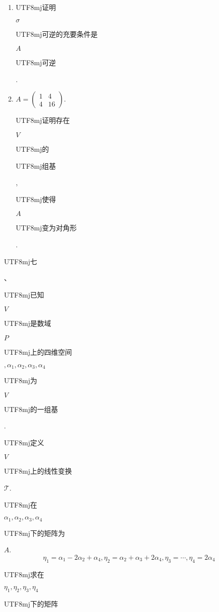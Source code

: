 \documentclass[10pt]{article}
\begin{document}
\begin{enumerate}
  \item \begin{CJK}{UTF8}{mj}证明\end{CJK} $\sigma$ \begin{CJK}{UTF8}{mj}可逆的充要条件是\end{CJK} $A$ \begin{CJK}{UTF8}{mj}可逆\end{CJK}.

  \item $A=\left(\begin{array}{cc}1 & 4 \\ 4 & 16\end{array}\right)$. \begin{CJK}{UTF8}{mj}证明存在\end{CJK} $V$ \begin{CJK}{UTF8}{mj}的\end{CJK} \begin{CJK}{UTF8}{mj}组基\end{CJK}, \begin{CJK}{UTF8}{mj}使得\end{CJK} $A$ \begin{CJK}{UTF8}{mj}变为对角形\end{CJK}.

\end{enumerate}
\begin{CJK}{UTF8}{mj}七\end{CJK}、\begin{CJK}{UTF8}{mj}已知\end{CJK} $V$ \begin{CJK}{UTF8}{mj}是数域\end{CJK} $P$ \begin{CJK}{UTF8}{mj}上的四维空间\end{CJK} $, \alpha_{1}, \alpha_{2}, \alpha_{3}, \alpha_{4}$ \begin{CJK}{UTF8}{mj}为\end{CJK} $V$ \begin{CJK}{UTF8}{mj}的一组基\end{CJK}. \begin{CJK}{UTF8}{mj}定义\end{CJK} $V$ \begin{CJK}{UTF8}{mj}上的线性变换\end{CJK} $\mathscr{T}$. \begin{CJK}{UTF8}{mj}在\end{CJK} $\alpha_{1}, \alpha_{2}, \alpha_{3}, \alpha_{4}$ \begin{CJK}{UTF8}{mj}下的矩阵为\end{CJK} $A$.
$$
\eta_{1}=\alpha_{1}-2 \alpha_{2}+\alpha_{4}, \eta_{2}=\alpha_{2}+\alpha_{3}+2 \alpha_{4}, \eta_{3}=\cdots, \eta_{4}=2 \alpha_{4}
$$
\begin{CJK}{UTF8}{mj}求在\end{CJK} $\eta_{1}, \eta_{2}, \eta_{3}, \eta_{4}$ \begin{CJK}{UTF8}{mj}下的矩阵\end{CJK}
\end{document}
